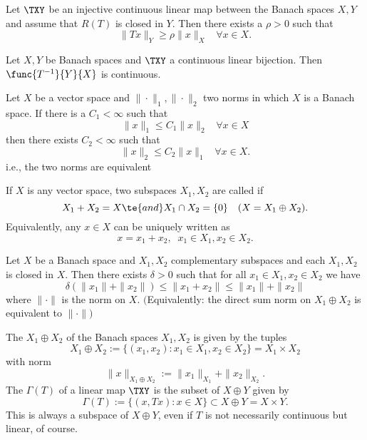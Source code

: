 \begin{cor}\label{vi.9}
    Let $\TXY$ be an injective continuous linear map between the Banach spaces $X,Y$ and assume that $R(T)$ is closed in $Y$. Then there exists a $\rho>0$ such that
    \[\|Tx\|_Y\geq\rho\|x\|_X\;\;\;\forall x\in X.\]
\end{cor}

\begin{thm}\label{vi.10}
    Let $X,Y$ be Banach spaces and $\TXY$ a continuous linear bijection. Then $\func{T^{-1}}{Y}{X}$ is continuous.
\end{thm}

\begin{cor}\label{vi.11}
    Let $X$ be a vector space and $\|\cdot\|_1,\|\cdot\|_2$ two norms in which $X$ is a Banach space. If there is a $C_1<\infty$ such that
    \[\|x\|_1\leq C_1\|x\|_2\;\;\;\forall x\in X\]
    then there exists $C_2<\infty$ such that
    \[\|x\|_2\leq C_2\|x\|_1\;\;\;\forall x\in X.\]
    \rec{(}i.e., the two norms are equivalent\rec{)}
\end{cor}

\begin{cor}\label{vi.12}
    If $X$ is any vector space, two subspaces $X_1,X_2$ are called  if 
    \[X_1+X_2=X\te{ and }X_1\cap X_2=\{0\} \quad (X = X_1 \oplus X_2).\]
    Equivalently, any $x\in X$ can be uniquely written as
    \[x=x_1+x_2,\;\;x_1\in X_1,x_2\in X_2.\]

    Let $X$ be a Banach space and $X_1,X_2$ complementary subspaces and each $X_1,X_2$ is closed \rec{(}in $X$\rec{)}. Then there exists $\delta>0$ such that for all $x_1\in X_1,x_2\in X_2$ we have 
    \[\delta(\|x_1\|+\|x_2\|)\leq\|x_1+x_2\|\leq\|x_1\|+\|x_2\|\tag{6.19}\label{6.19}\]
    where $\|\cdot\|$ is the norm on $X$. $\big($Equivalently: the direct sum norm on $X_1\oplus X_2$ is equivalent to $\|\cdot\|\big)$
\end{cor}

\begin{definition}\label{vi.13}
    The  $X_1\oplus X_2$ of the Banach spaces $X_1,X_2$ is given by the tuples
    \[X_1\oplus X_2:=\{(x_1,x_2)\colon x_1\in X_1,x_2\in X_2\}=X_1\times X_2\]
    with norm
    \[\|x\|_{X_1\oplus X_2}:=\|x_1\|_{X_1}+\|x_2\|_{X_2}.\]
    The  $\Gamma(T)$ of a linear map $\TXY$ is the subset of $X\oplus Y$ given by
    \[\Gamma(T):=\{(x,Tx)\colon x\in X\}\subset X\oplus Y=X\times Y.\]
    This is always a subspace of $X\oplus Y$, even if $T$ is not necessarily continuous \rec{(}but linear, of course\rec{)}.
\end{definition}

